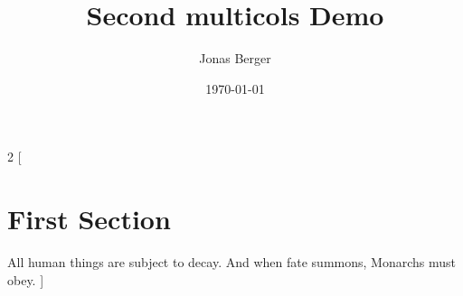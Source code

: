 \documentclass{article}
\title{Second multicols Demo}
\author{Jonas Berger}
\date{\today}
\begin{document}
\maketitle
	
\begin{multicols}{2}
[
	\section{First Section}
	All human things are subject to decay. And when fate summons, Monarchs must obey.
]
\blindtext\blindtext
\end{multicols}
\end{document}
